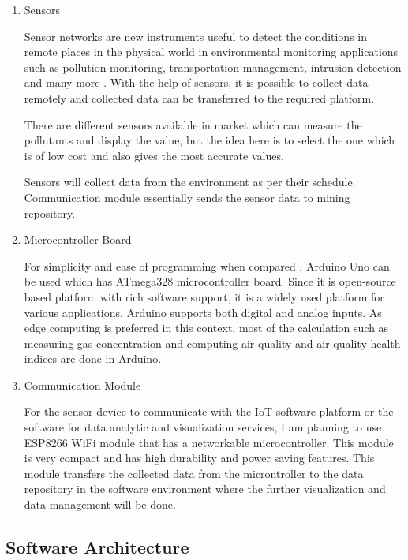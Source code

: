 \documentclass[11pt]{article}
\begin{document}
\begin{enumerate}
\item Sensors




Sensor networks are new instruments useful to detect the conditions in remote places in the physical world \cite{JD04} in environmental monitoring applications such as pollution monitoring, transportation management, intrusion detection and many more \cite{JLLLNBNR11}. With the help of sensors, it is possible to collect data remotely and collected data can be transferred to the required platform.

There are different sensors available in market which can measure the pollutants and display the value, but the idea here is to select the one which is of low cost and also gives the most accurate values.

 
Sensors will collect data from the environment as per their schedule. Communication module essentially sends the sensor data to mining repository. 


\newpage

 \item {Microcontroller Board}


 
 For simplicity and ease of programming when compared , Arduino Uno can be used which has ATmega328 microcontroller board. Since it is open-source based platform with rich software support, it is a widely used platform for various applications. Arduino supports both digital and analog inputs. As edge computing is preferred in this context, most of the calculation such as measuring gas concentration and computing air quality and air quality health indices are done in Arduino.



 \item {Communication Module}

    For the sensor device to communicate with the IoT software platform  or the software for data analytic and visualization services, I am planning to use ESP8266 WiFi module that has a networkable microcontroller. This module is very compact and has high durability and power saving features. This module transfers the collected data from the microntroller to the data repository in the software environment where the further visualization and data management will be done.
      \end{enumerate}
      
 
 \subsection{Software Architecture}
 
\end{document}
